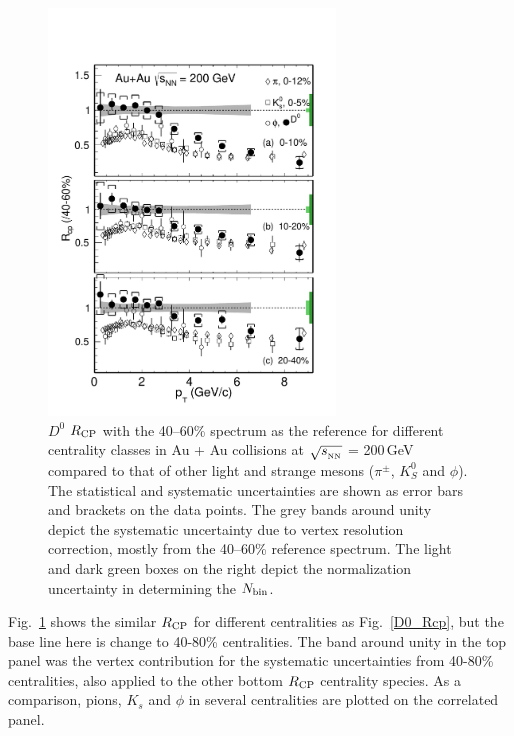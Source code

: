 \begin{figure}
\centering
\includegraphics[width=0.68\textwidth]{figure/Run14_D0HFT/D0_Rcp2.pdf}
\caption{$D^{0}$ $R_{\rm CP}$ with the 40--60\% spectrum as the reference for different centrality classes in Au + Au collisions at $\sqrt{s_{_{\rm NN}}}$ = 200\,GeV compared to that of other light and strange mesons ($\pi^{\pm}$, $K^0_{S}$ and $\phi$). The statistical and systematic uncertainties are shown as error bars and brackets on the data points. The grey bands around unity depict the systematic uncertainty due to vertex resolution correction, mostly from the 40--60\% reference spectrum. The light and dark green boxes on the right depict the normalization uncertainty in determining the $N_{\rm bin}$.}
\label{D0_Rcp2} 
\end{figure}

Fig.~\ref{D0_Rcp2} shows the similar $R_{\rm CP}$ for different centralities as Fig.~\ref{D0_Rcp}, but the base line here is change to 40-80\% centralities. The band around unity in the top panel was the vertex contribution for the systematic uncertainties from 40-80\% centralities, also applied to the other bottom $R_{\rm CP}$ centrality species. As a comparison, pions, $K_{s}$ and $\phi$ in several centralities are plotted on the correlated panel.

